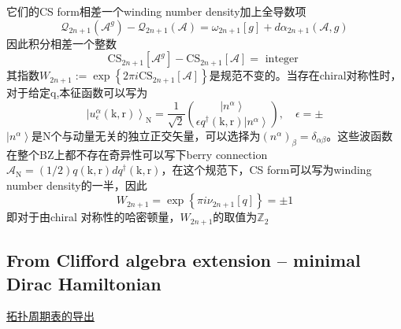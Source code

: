 \documentclass[10pt,openany]{book}
\theoremstyle{thmstyle} %
\theoremstyle{defstyle} %
\theoremstyle{prostyle} %
\begin{document}
它们的CS form相差一个winding number density加上全导数项
\begin{equation}
  \mathcal{Q}_{2 n+1}\left(\mathcal{A}^g\right)-\mathcal{Q}_{2 n+1}(\mathcal{A})=\omega_{2 n+1}[g]+d \alpha_{2 n+1}(\mathcal{A}, g)
\end{equation}
因此积分相差一个整数
\begin{equation}
  \mathrm{CS}_{2 n+1}\left[\mathcal{A}^g\right]-\mathrm{CS}_{2 n+1}[\mathcal{A}]=\text { integer }
\end{equation}
其指数$ W_{2 n+1}:=\exp \left\{2 \pi i \mathrm{CS}_{2 n+1}[\mathcal{A}]\right\} $是规范不变的。当存在chiral对称性时，对于给定q,本征函数可以写为
\begin{equation}
  \left|u_\epsilon^\alpha(\mathrm{k}, \mathrm{r})\right\rangle_{\mathrm{N}}=\frac{1}{\sqrt{2}}\binom{\left|n^\alpha\right\rangle}{\epsilon q^{\dagger}(\mathrm{k}, \mathrm{r})\left|n^\alpha\right\rangle}, \quad \epsilon= \pm
\end{equation} 
$ \left|n^\alpha\right\rangle $是N个与动量无关的独立正交矢量，可以选择为$ \left(n^\alpha\right)_\beta=\delta_{\alpha \beta} $。这些波函数在整个BZ上都不存在奇异性可以写下berry connection$ \mathcal{A}_{\mathrm{N}}=(1 / 2) q(\mathrm{k}, \mathrm{r}) d q^{\dagger}(\mathrm{k}, \mathrm{r}) $，在这个规范下，CS form可以写为winding number density的一半，因此 
\begin{equation}
  W_{2 n+1}=\exp \left\{\pi i \nu_{2 n+1}[q]\right\}= \pm 1
\end{equation}  
即对于由chiral 对称性的哈密顿量，$ W_{2 n+1} $的取值为$ \mathbb{Z}_2 $  
\subsection{From Clifford algebra extension -- minimal Dirac Hamiltonian}
\href{https://zhuanlan.zhihu.com/p/33923555}{拓扑周期表的导出}
\end{document}
